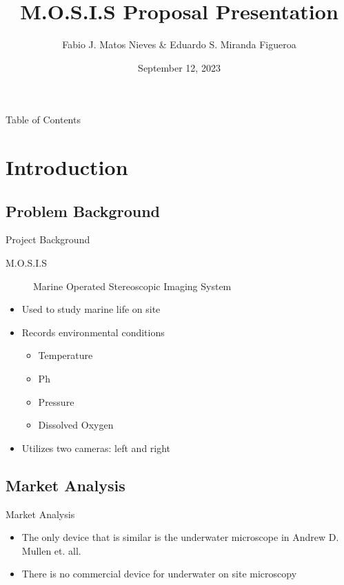 \documentclass[14pt, aspectratio=169]{beamer}
\title{M.O.S.I.S Proposal Presentation}
\author{Fabio J. Matos Nieves \& Eduardo S. Miranda Figueroa }
\institute{Univerity of Puerto Rico Mayagüez Campus}
\date{September 12, 2023}
\begin{document}
\begin{frame}
	\maketitle
\end{frame}

\begin{frame}{Table of Contents}
	\tableofcontents
\end{frame}
\section{Introduction}
\subsection{Problem Background}
\begin{frame}{Project Background}
	\begin{description}
		\item[M.O.S.I.S] Marine Operated Stereoscopic Imaging System
	\end{description}
	\begin{itemize}
		\item Used to study marine life on site
		\item Records environmental conditions
		      \begin{itemize}
			      \item Temperature
			      \item Ph
			      \item Pressure
			      \item Dissolved Oxygen
		      \end{itemize}
		\item Utilizes two cameras: left and right
	\end{itemize}
\end{frame}
\subsection{Market Analysis}
\begin{frame}{Market Analysis}
\begin{itemize}
	\item The only device that is similar is the underwater microscope in Andrew D. Mullen et. all.
	\item There is no commercial device for underwater on site microscopy
\end{itemize}
\end{frame}
\end{document}
